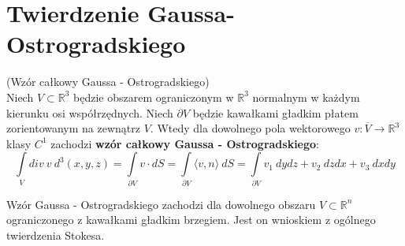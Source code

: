 \section{Twierdzenie Gaussa-Ostrogradskiego}

\begin{tw}{(Wzór całkowy Gaussa - Ostrogradskiego)}\\
	Niech $V\subset\mathbb{R}^3$ będzie obszarem ograniczonym w $\mathbb{R}^3$ normalnym w każdym kierunku osi współrzędnych. Niech $\partial V$ będzie kawałkami gładkim płatem zorientowanym na zewnątrz $V$. Wtedy dla dowolnego pola wektorowego $v:\overline{V}\rightarrow\mathbb{R}^3$ klasy $C^1$ zachodzi \textbf{wzór całkowy Gaussa - Ostrogradskiego}: $$\int\limits_V div\ v\ d^3(x,y,z)=\int\limits_{\partial V}v\cdot dS=\int\limits_{\partial V}\langle v,n\rangle\ dS=\int\limits_{\partial V} v_1\ dydz+v_2\ dzdx+v_3\ dxdy$$
\end{tw}

\begin{uwg}
	Wzór Gaussa - Ostrogradskiego zachodzi dla dowolnego obszaru $V\subset\mathbb{R}^n$ ograniczonego z kawałkami gładkim brzegiem. Jest on wnioskiem z ogólnego twierdzenia Stokesa.
\end{uwg}